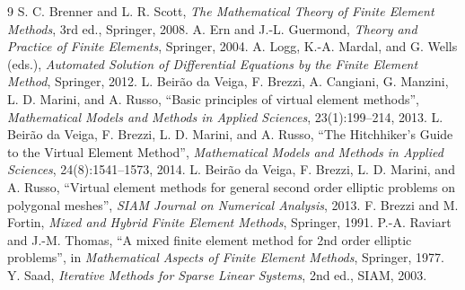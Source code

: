 \documentclass[11pt,oneside]{book}
\theoremstyle{definition}
\theoremstyle{plain}
\begin{document}
\begin{thebibliography}{9}
 S. C. Brenner and L. R. Scott,
  \emph{The Mathematical Theory of Finite Element Methods}, 3rd ed.,
  Springer, 2008.
 A. Ern and J.-L. Guermond,
  \emph{Theory and Practice of Finite Elements}, Springer, 2004.
 A. Logg, K.-A. Mardal, and G. Wells (eds.),
  \emph{Automated Solution of Differential Equations by the Finite Element Method},
  Springer, 2012.
 L. Beir\~ao da Veiga, F. Brezzi, A. Cangiani,
  G. Manzini, L. D. Marini, and A. Russo,
  ``Basic principles of virtual element methods'',
  \emph{Mathematical Models and Methods in Applied Sciences}, 23(1):199--214, 2013.
 L. Beir\~ao da Veiga, F. Brezzi, L. D. Marini, and A. Russo,
  ``The Hitchhiker's Guide to the Virtual Element Method'',
  \emph{Mathematical Models and Methods in Applied Sciences}, 24(8):1541--1573, 2014.
 L. Beir\~ao da Veiga, F. Brezzi, L. D. Marini, and A. Russo,
  ``Virtual element methods for general second order elliptic problems on
  polygonal meshes'', \emph{SIAM Journal on Numerical Analysis}, 2013.
 F. Brezzi and M. Fortin,
  \emph{Mixed and Hybrid Finite Element Methods}, Springer, 1991.
 P.-A. Raviart and J.-M. Thomas,
  ``A mixed finite element method for 2nd order elliptic problems'',
  in \emph{Mathematical Aspects of Finite Element Methods}, Springer, 1977.
 Y. Saad, \emph{Iterative Methods for Sparse Linear Systems},
  2nd ed., SIAM, 2003.
\end{thebibliography}
\end{document}
